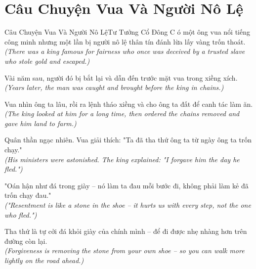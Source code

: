 \section{Câu Chuyện Vua Và Người Nô Lệ}
\begin{truyen}{Câu Chuyện Vua Và Người Nô Lệ}{Tư Tưởng Cổ Đông}
C ó một ông vua nổi tiếng công minh nhưng một lần bị người nô lệ thân tín đánh lừa lấy vàng trốn thoát.\\
\textit{(There was a king famous for fairness who once was deceived by a trusted slave who stole gold and escaped.)}

Vài năm sau, người đó bị bắt lại và dẫn đến trước mặt vua trong xiềng xích.\\
\textit{(Years later, the man was caught and brought before the king in chains.)}

Vua nhìn ông ta lâu, rồi ra lệnh tháo xiềng và cho ông ta đất để canh tác làm ăn.\\
\textit{(The king looked at him for a long time, then ordered the chains removed and gave him land to farm.)}

Quân thần ngạc nhiên. Vua giải thích: "Ta đã tha thứ ông ta từ ngày ông ta trốn chạy."\\
\textit{(His ministers were astonished. The king explained: "I forgave him the day he fled.")}

"Oán hận như đá trong giày -- nó làm ta đau mỗi bước đi, không phải làm kẻ đã trốn chạy đau."\\
\textit{("Resentment is like a stone in the shoe -- it hurts us with every step, not the one who fled.")}

\end{truyen}
\begin{baihoc}
  Tha thứ là tự cởi đá khỏi giày của chính mình -- để đi được nhẹ nhàng hơn trên đường còn lại.\\
  \textit{(Forgiveness is removing the stone from your own shoe -- so you can walk more lightly on the road ahead.)}
\end{baihoc}

